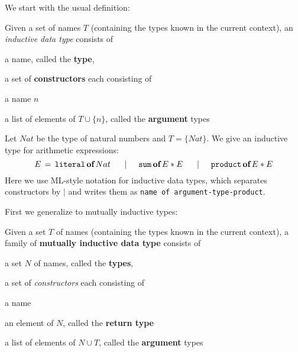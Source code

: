 We start with the usual definition:

\begin{definition}\label{def:idt}
Given a set of names $T$ (containing the types known in the current context), an \emph{inductive data type} consists of
\begin{compactitem}
 \item a name, called the \textbf{type},
 \item a set of \textbf{constructors} each consisting of
 \begin{compactitem}
  \item a name $n$
  \item a list of elements of $T\cup\{n\}$, called the \textbf{argument} types
 \end{compactitem} 
\end{compactitem}
\end{definition}

\newcommand{\cons}[2]{\mathtt{#1}\,\kw{of}\,\fold{*}{#2}}
\newcommand{\indtype}[2]{#1\,=\,\fold{\;\tb|\tb}{#2}}
\newcommand{\consnot}[3]{\mathtt{#1}\,\kw{of}\,\fold{*}{#2}\,\#\,#3}
\newcommand{\consn}[2]{\mathtt{#1}\,\#\,#2}

\begin{example}
Let $Nat$ be the type of natural numbers and $T=\{Nat\}$.
We give an inductive type for arithmetic expressions:
\[
\indtype{E}{\cons{literal}{Nat}, \cons{sum}{E,E}, \cons{product}{E,E}} \\
\]
Here we use ML-style notation for inductive data types, which separates constructors by $|$ and writes them as \texttt{name of argument-type-product}.
\end{example}

First we generalize to mutually inductive types:

\begin{definition}
Given a set $T$ of names (containing the types known in the current context), a family of \textbf{mutually inductive data type} consists of
\begin{compactitem}
 \item a set $N$ of names, called the \textbf{types},
 \item a set of \emph{constructors} each consisting of
 \begin{compactitem}
  \item a name
  \item an element of $N$, called the \textbf{return type}
  \item a list of elements of $N\cup T$, called the \textbf{argument} types
 \end{compactitem} 
\end{compactitem}
\end{definition}

